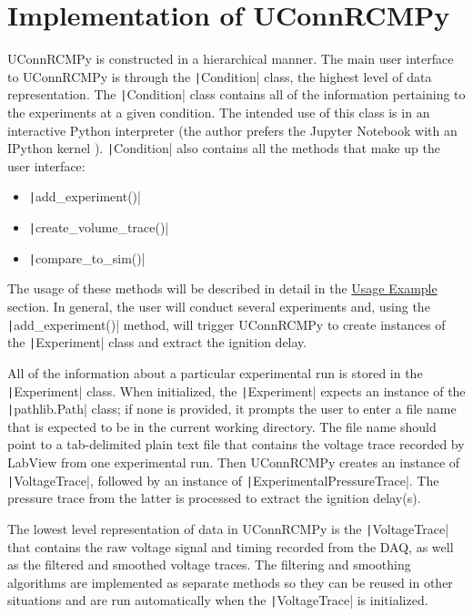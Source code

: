 \documentclass[12pt]{../ussci}
\begin{document}
\section{Implementation of
UConnRCMPy}\label{implementation-of-uconnrcmpy}

UConnRCMPy is constructed in a hierarchical manner. The main user
interface to UConnRCMPy is through the \texttt|Condition| class, the
highest level of data representation. The \texttt|Condition| class
contains all of the information pertaining to the experiments at a given
condition. The intended use of this class is in an interactive Python
interpreter (the author prefers the Jupyter Notebook with an IPython
kernel \autocite{Perez2007}). \texttt|Condition| also contains all the
methods that make up the user interface:

\begin{itemize}
\item
  \texttt|add_experiment()|
\item
  \texttt|create_volume_trace()|
\item
  \texttt|compare_to_sim()|
\end{itemize}

The usage of these methods will be described in detail in the
\href{usage-example}{Usage Example} section. In general, the user will
conduct several experiments and, using the \texttt|add_experiment()|
method, will trigger UConnRCMPy to create instances of the
\texttt|Experiment| class and extract the ignition delay.

All of the information about a particular experimental run is stored in
the \texttt|Experiment| class. When initialized, the \texttt|Experiment|
expects an instance of the \texttt|pathlib.Path| class; if none is
provided, it prompts the user to enter a file name that is expected to
be in the current working directory. The file name should point to a
tab-delimited plain text file that contains the voltage trace recorded
by LabView from one experimental run. Then UConnRCMPy creates an
instance of \texttt|VoltageTrace|, followed by an instance of
\texttt|ExperimentalPressureTrace|. The pressure trace from the latter
is processed to extract the ignition delay(s).

The lowest level representation of data in UConnRCMPy is the
\texttt|VoltageTrace| that contains the raw voltage signal and timing
recorded from the DAQ, as well as the filtered and smoothed voltage
traces. The filtering and smoothing algorithms are implemented as
separate methods so they can be reused in other situations and are run
automatically when the \texttt|VoltageTrace| is initialized.
\end{document}
